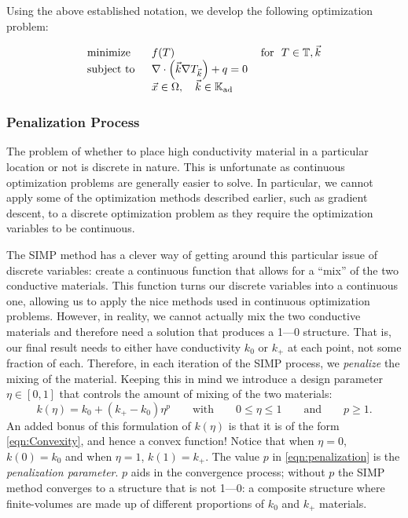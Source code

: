 Using the above established notation, we develop the following optimization problem:

	\begin{equation}
		\begin{tabular}{lll}
			\text{minimize }   & $f(T)$ & \text{for } $T\in\mathbb{T},\vec{k}$      \\
			\text{subject to } & $\nabla\cdot\left(\vec{k}\nabla T_{\vec{k}}\right)+q=0$ & \\
			& $\vec{x}\in\Omega,\quad\vec{k}\in\mathbb{K}_{\text{ad}}$&      
		\end{tabular}\label{SIMP-Optimization-Problem}
	\end{equation}

\subsubsection*{Penalization Process}
The problem of whether to place high conductivity material in a particular location or not is discrete in nature. This is unfortunate as continuous optimization problems are generally easier to solve. In particular, we cannot apply some of the optimization methods described earlier, such as gradient descent, to a discrete optimization problem as they require the optimization variables to be continuous.

The SIMP method has a clever way of getting around this particular issue of discrete variables: create a continuous function that allows for a ``mix'' of the two conductive materials. This function turns our discrete variables into a continuous one, allowing us to apply the nice methods used in continuous optimization problems. However, in reality, we cannot actually mix the two conductive materials and therefore need a solution that produces a 1---0 structure. That is, our final result needs to either have conductivity $k_0$ or $k_+$ at each point, not some fraction of each. Therefore, in each iteration of the SIMP process, we \textit{penalize} the mixing of the material. Keeping this in mind we introduce a design parameter $\eta\in\left[0,1\right]$ that controls the amount of mixing of the two materials:
\begin{equation}
	k\left(\eta\right)=k_0+\left(k_+-k_0\right)\eta^p\qquad\text{with}\qquad 0\leq\eta\leq 1\qquad\text{and}\qquad p\geq1.\label{eqn:penalization}
\end{equation}
An added bonus of this formulation of $k(\eta)$ is that it is of the form \eqref{eqn:Convexity}, and hence a convex function! Notice that when $\eta=0$, $k\left(0\right)=k_0$ and when $\eta=1$, $k\left(1\right)=k_+$. The value $p$ in \eqref{eqn:penalization} is the \textit{penalization parameter}. $p$ aids in the convergence process; without $p$ the SIMP method converges to a structure that is not 1---0: a composite structure where finite-volumes are made up of different proportions of $k_0$ and $k_+$ materials.

